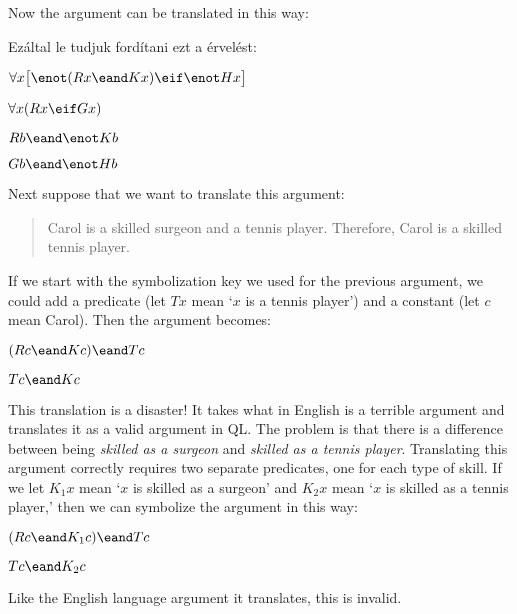 Now the argument can be translated in this way:

Ezáltal le tudjuk fordítani ezt a érvelést:
\begin{earg}
\label{surgeon2}
\item[] $\forall x\bigl[\enot (Rx \eand Kx) \eif \enot Hx\bigr]$
\item[] $\forall x(Rx \eif Gx)$
\item[] $Rb \eand \enot Kb$
\item[\therefore] $Gb \eand \enot Hb$
\end{earg}




Next suppose that we want to translate this argument:
\begin{quote}
\label{surgeon3}
Carol is a skilled surgeon and a tennis player. Therefore, Carol is a skilled tennis player.
\end{quote}
If we start with the symbolization key we used for the previous argument, we could add a predicate (let $Tx$ mean `$x$ is a tennis player') and a constant (let $c$ mean Carol). Then the argument becomes:
\begin{earg}
\item[] $(Rc \eand Kc) \eand Tc$
\item[\therefore] $Tc \eand Kc$
\end{earg}
This translation is a disaster! It takes what in English is a terrible argument and translates it as a valid argument in QL. The problem is that there is a difference between being \emph{skilled as a surgeon} and \emph{skilled as a tennis player}. Translating this argument correctly requires two separate predicates, one for each type of skill. If we let $K_1x$ mean `$x$ is skilled as a surgeon' and $K_2x$ mean `$x$ is skilled as a tennis player,' then we can symbolize the argument in this way:
\begin{earg}
\label{surgeon3correct}
\item[] $(Rc \eand K_1c) \eand Tc$
\item[\therefore] $Tc \eand K_2c$
\end{earg}
Like the English language argument it translates, this is invalid. %

